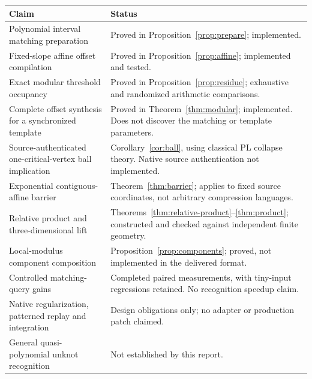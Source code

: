 \documentclass[11pt,letterpaper]{article}
\theoremstyle{definition}
\theoremstyle{remark}\newtheorem{remark}[theorem]{Remark}
\begin{document}
\small
\begin{longtable}{p{}p{}}
\toprule
Claim & Status\\\midrule\endhead
Polynomial interval matching preparation & Proved in Proposition~\ref{prop:prepare}; implemented.\\
Fixed-slope affine offset compilation & Proved in Proposition~\ref{prop:affine}; implemented and tested.\\
Exact modular threshold occupancy & Proved in Proposition~\ref{prop:residue}; exhaustive and randomized arithmetic comparisons.\\
Complete offset synthesis for a synchronized template & Proved in Theorem~\ref{thm:modular}; implemented. Does not discover the matching or template parameters.\\
Source-authenticated one-critical-vertex ball implication & Corollary~\ref{cor:ball}, using classical PL collapse theory. Native source authentication not implemented.\\
Exponential contiguous-affine barrier & Theorem~\ref{thm:barrier}; applies to fixed source coordinates, not arbitrary compression languages.\\
Relative product and three-dimensional lift & Theorems~\ref{thm:relative-product}--\ref{thm:product}; constructed and checked against independent finite geometry.\\
Local-modulus component composition & Proposition~\ref{prop:components}; proved, not implemented in the delivered format.\\
Controlled matching-query gains & Completed paired measurements, with tiny-input regressions retained. No recognition speedup claim.\\
Native regularization, patterned replay and integration & Design obligations only; no adapter or production patch claimed.\\
General quasi-polynomial unknot recognition & Not established by this report.\\
\bottomrule
\end{longtable}
\normalsize
\end{document}
